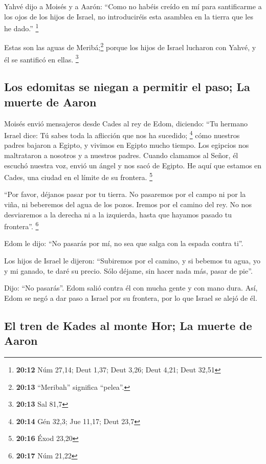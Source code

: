  Yahvé dijo a Moisés y a Aarón: ``Como no habéis creído
en mí para santificarme a los ojos de los hijos de Israel, no
introduciréis esta asamblea en la tierra que les he dado.'' \footnote{\textbf{20:12}
  Núm 27,14; Deut 1,37; Deut 3,26; Deut 4,21; Deut 32,51}

 Estas son las aguas de Meribá;\footnote{\textbf{20:13}
  ``Meribah'' significa ``pelea''.} porque los hijos de Israel lucharon
con Yahvé, y él se santificó en ellas. \footnote{\textbf{20:13} Sal 81,7}

\hypertarget{los-edomitas-se-niegan-a-permitir-el-paso-la-muerte-de-aaron}{%
\subsection{Los edomitas se niegan a permitir el paso; La muerte de
Aaron}\label{los-edomitas-se-niegan-a-permitir-el-paso-la-muerte-de-aaron}}

 Moisés envió mensajeros desde Cades al rey de Edom,
diciendo: ``Tu hermano Israel dice: Tú sabes toda la aflicción que nos
ha sucedido; \footnote{\textbf{20:14} Gén 32,3; Jue 11,17; Deut 23,7}
 cómo nuestros padres bajaron a Egipto, y vivimos en
Egipto mucho tiempo. Los egipcios nos maltrataron a nosotros y a
nuestros padres.  Cuando clamamos al Señor, él escuchó
nuestra voz, envió un ángel y nos sacó de Egipto. He aquí que estamos en
Cades, una ciudad en el límite de su frontera. \footnote{\textbf{20:16}
  Éxod 23,20}

 ``Por favor, déjanos pasar por tu tierra. No pasaremos
por el campo ni por la viña, ni beberemos del agua de los pozos. Iremos
por el camino del rey. No nos desviaremos a la derecha ni a la
izquierda, hasta que hayamos pasado tu frontera''. \footnote{\textbf{20:17}
  Núm 21,22}

 Edom le dijo: ``No pasarás por mí, no sea que salga con
la espada contra ti''.

 Los hijos de Israel le dijeron: ``Subiremos por el
camino, y si bebemos tu agua, yo y mi ganado, te daré su precio. Sólo
déjame, sin hacer nada más, pasar de pie''.

 Dijo: ``No pasarás''. Edom salió contra él con mucha
gente y con mano dura.  Así, Edom se negó a dar paso a
Israel por su frontera, por lo que Israel se alejó de él.

\hypertarget{el-tren-de-kades-al-monte-hor-la-muerte-de-aaron}{%
\subsection{El tren de Kades al monte Hor; La muerte de
Aaron}\label{el-tren-de-kades-al-monte-hor-la-muerte-de-aaron}}

